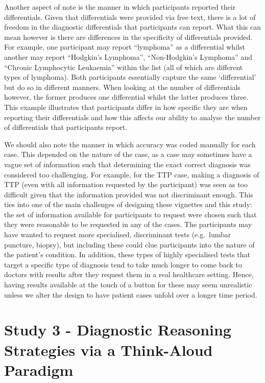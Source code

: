 \documentclass[a4paper, nobind]{templates/ociamthesis}
\begin{document}
Another aspect of note is the manner in which participants reported their differentials. Given that differentials were provided via free text, there is a lot of freedom in the diagnostic differentials that participants can report. What this can mean however is there are differences in the specificity of differentials provided. For example, one participant may report ``lymphoma'' as a differential whilst another may report ``Hodgkin's Lymphoma'', ``Non-Hodgkin's Lymphoma'' and ``Chronic Lymphocytic Leukaemia'' within the list (all of which are different types of lymphoma). Both participants essentially capture the same `differential' but do so in different manners. When looking at the number of differentials however, the former produces one differential whilst the latter produces three. This example illustrates that participants differ in how specific they are when reporting their differentials and how this affects our ability to analyse the number of differentials that participants report.

We should also note the manner in which accuracy was coded manually for each case. This depended on the nature of the case, as a case may sometimes have a vague set of information such that determining the exact correct diagnosis was considered too challenging. For example, for the TTP case, making a diagnosis of TTP (even with all information requested by the participant) was seen as too difficult given that the information provided was not discriminant enough. This ties into one of the main challenges of designing these vignettes and this study: the set of information available for participants to request were chosen such that they were reasonable to be requested in any of the cases. The participants may have wanted to request more specialised, discriminant tests (e.g.~lumbar puncture, biopsy), but including these could clue participants into the nature of the patient's condition. In addition, these types of highly specialised tests that target a specific type of diagnosis tend to take much longer to come back to doctors with results after they request them in a real healthcare setting. Hence, having results available at the touch of a button for these may seem unrealistic unless we alter the design to have patient cases unfold over a longer time period.

\hypertarget{study-3---diagnostic-reasoning-strategies-via-a-think-aloud-paradigm}{%
\chapter*{Study 3 - Diagnostic Reasoning Strategies via a Think-Aloud Paradigm}\label{study-3---diagnostic-reasoning-strategies-via-a-think-aloud-paradigm}}
\end{document}
